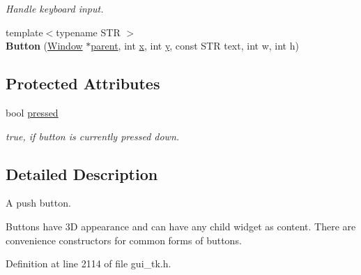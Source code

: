 \begin{DoxyCompactItemize}
\begin{DoxyCompactList}\small\item\em Handle keyboard input. \end{DoxyCompactList}\item 
\hypertarget{classGUI_1_1Button_ada8368b22e9bfcfa7ba9199f9ea3f7cc}{{\footnotesize template$<$typename S\-T\-R $>$ }\\{\bfseries Button} (\hyperlink{classGUI_1_1Window}{Window} $\ast$\hyperlink{classGUI_1_1Window_a2e593ff65e7702178d82fe9010a0b539}{parent}, int \hyperlink{classGUI_1_1Window_a6ca6a80ca00c9e1d8ceea8d3d99a657d}{x}, int \hyperlink{classGUI_1_1Window_a0ee8e923aff2c3661fc2e17656d37adf}{y}, const S\-T\-R text, int w, int h)}\label{classGUI_1_1Button_ada8368b22e9bfcfa7ba9199f9ea3f7cc}

\end{DoxyCompactItemize}
\subsection*{Protected Attributes}
\begin{DoxyCompactItemize}
\item 
\hypertarget{classGUI_1_1Button_aec37fa9a4a6ea6d1e0e2788d42d67ee1}{bool \hyperlink{classGUI_1_1Button_aec37fa9a4a6ea6d1e0e2788d42d67ee1}{pressed}}\label{classGUI_1_1Button_aec37fa9a4a6ea6d1e0e2788d42d67ee1}

\begin{DoxyCompactList}\small\item\em {\ttfamily true}, if button is currently pressed down. \end{DoxyCompactList}\end{DoxyCompactItemize}


\subsection{Detailed Description}
A push button. 

Buttons have 3\-D appearance and can have any child widget as content. There are convenience constructors for common forms of buttons. 

Definition at line 2114 of file gui\-\_\-tk.\-h.



